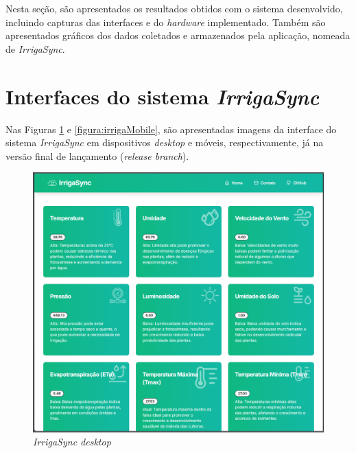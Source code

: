 Nesta seção, são apresentados os resultados obtidos com o sistema desenvolvido, incluindo capturas das interfaces e do \textit{hardware} implementado. Também são apresentados gráficos dos dados coletados e armazenados pela aplicação, nomeada de \textit{IrrigaSync}.

\section{Interfaces do sistema \textit{IrrigaSync}}

Nas Figuras \ref{figura:irrigaDesktop} e \ref{figura:irrigaMobile}, são apresentadas imagens da interface do sistema \textit{IrrigaSync} em dispositivos \textit{desktop} e móveis, respectivamente, já na versão final de lançamento (\textit{release branch}).

\begin{figure}[!htb] \centering
\caption{\textit{IrrigaSync desktop}} \label{figura:irrigaDesktop}
\begin{varwidth}{\linewidth}
\includegraphics[width=16cm]{figuras/irrigaSync.png}
\end{varwidth}
\end{figure}

